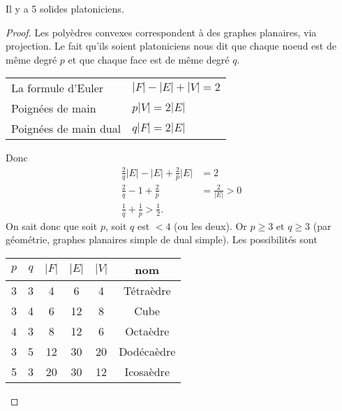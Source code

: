 \begin{mytheo}
  Il y a 5 solides platoniciens.
  \begin{proof}
    Les polyèdres convexes correspondent à des graphes planaires, via projection.
    Le fait qu'ils soient platoniciens nous dit que chaque noeud est de même degré $p$ et que chaque face est de même degré $q$.
    \begin{center}
      \begin{tabular}{ll}
        La formule d'Euler & $|F| - |E| + |V| = 2$\\
        Poignées de main & $p|V| = 2|E|$\\
        Poignées de main dual & $q|F| = 2|E|$
      \end{tabular}
    \end{center}
    Donc
    \begin{align*}
      \frac{2}{q}|E| - |E| + \frac{2}{p} |E| & = 2\\
      \frac{2}{q} - 1 + \frac{2}{p} & = \frac{2}{|E|} > 0\\
      \frac{1}{q} + \frac{1}{p} > \frac{1}{2}.
    \end{align*}
    On sait donc que soit $p$, soit $q$ est $< 4$ (ou les deux).
    Or $p \geq 3$ et $q \geq 3$ (par géométrie, graphes planaires simple de dual simple).
    Les possibilités sont
    \begin{center}
      \begin{tabular}{|c|c|c|c|c|c|}
        \hline
        $p$ & $q$ & $|F|$ & $|E|$ & $|V|$ & nom\\
        \hline
        3 & 3 & 4 & 6 & 4 & Tétraèdre\\
        3 & 4 & 6 & 12 & 8 & Cube\\
        4 & 3 & 8 & 12 & 6 & Octaèdre\\
        3 & 5 & 12 & 30 & 20 & Dodécaèdre\\
        5 & 3 & 20 & 30 & 12 & Icosaèdre\\
        \hline
      \end{tabular}
    \end{center}
  \end{proof}
\end{mytheo}

